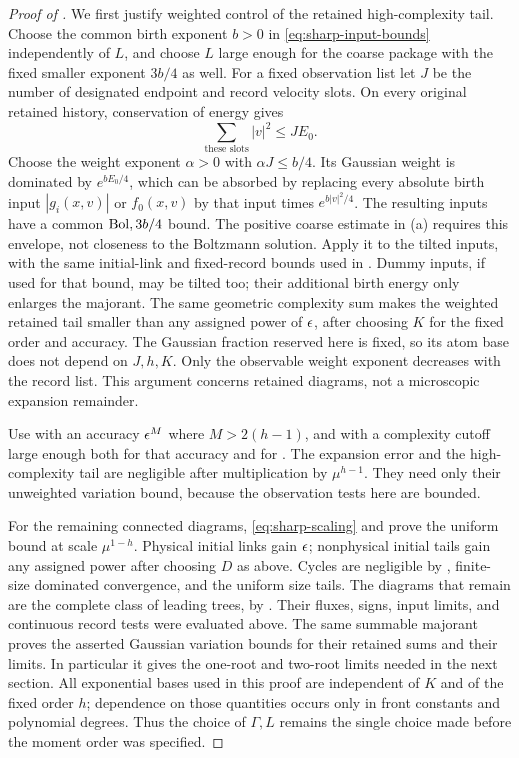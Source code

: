 \begin{proof}[Proof of ]
We first justify weighted control of the retained high-complexity
tail.  Choose the common birth exponent \(b>0\) in
\eqref{eq:sharp-input-bounds} independently of \(L\), and choose
\(L\) large enough for the coarse package with the fixed smaller
exponent \(3b/4\) as well.  For a fixed observation list let \(J\)
be the number of designated endpoint and record velocity slots.
On every original retained history, conservation of energy gives
\[
 \sum_{\text{these slots}}|v|^2\le J E_0.
\]
Choose the weight exponent \(\alpha>0\) with \(\alpha J\le b/4\).
Its Gaussian weight is dominated by \(e^{bE_0/4}\), which can be
absorbed by replacing every absolute birth input \(|g_i(x,v)|\)
or \(f_0(x,v)\) by that input times \(e^{b|v|^2/4}\).
The resulting inputs have a common \(\mathrm{Bol},3b/4\) bound.
The positive coarse estimate in (a)
requires this envelope, not closeness to the Boltzmann solution.
Apply it to the tilted inputs, with the same initial-link and
fixed-record bounds used in .
Dummy inputs, if used for that bound, may be tilted too;
their additional birth energy only enlarges the majorant.
The same geometric complexity sum makes the weighted retained
tail smaller than any assigned power of \(\epsilon\), after choosing
\(K\) for the fixed order and accuracy.  The Gaussian fraction
reserved here is fixed, so its atom base does not depend on
\(J,h,K\).  Only the observable weight exponent decreases with
the record list.  This argument concerns retained diagrams,
not a microscopic expansion remainder.

Use  with an accuracy
\(\epsilon^M\) where \(M>2(h-1)\), and with a complexity cutoff
large enough both for that accuracy and for
.  The expansion error and
the high-complexity tail are negligible after multiplication
by \(\mu^{h-1}\).  They need only their unweighted variation
bound, because the observation tests here are bounded.

For the remaining connected diagrams,
\eqref{eq:sharp-scaling} and
 prove the uniform bound at scale
\(\mu^{1-h}\).  Physical initial links gain \(\epsilon\);
nonphysical initial tails gain any assigned power after
choosing \(D\) as above.  Cycles are negligible by
, finite-size dominated convergence,
and the uniform size tails.  The diagrams that remain are
the complete class of leading trees, by
.  Their fluxes, signs,
input limits, and continuous record tests were evaluated
above.  The same summable majorant proves the asserted
Gaussian variation bounds for their retained sums and
their limits.  In particular it gives the one-root and
two-root limits needed in the next section.  All exponential
bases used in this proof are independent of \(K\) and of
the fixed order \(h\); dependence on those quantities occurs
only in front constants and polynomial degrees.  Thus the
choice of \(\Gamma,L\) remains the single choice made before
the moment order was specified.
\end{proof}
